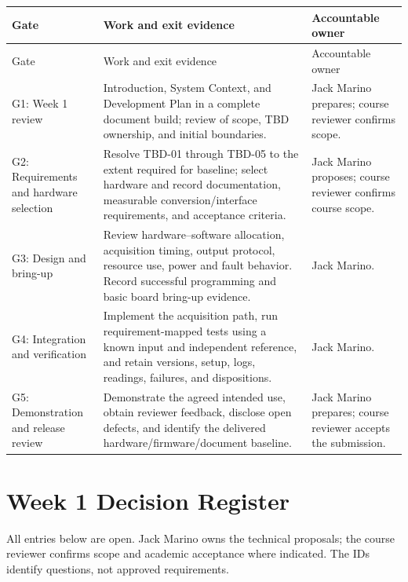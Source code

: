 \small
\begin{tabularx}{\linewidth}{L{2.4cm}Y L{3.1cm}}
\caption{Proposed Development Milestones\label{Table:WeekOneMilestones}}\\
\toprule
Gate & Work and exit evidence & Accountable owner\\
\midrule
\endfirsthead
\toprule
Gate & Work and exit evidence & Accountable owner\\
\midrule
\endhead
\bottomrule
\endlastfoot
G1: Week 1 review &
Introduction, System Context, and Development Plan in a complete document
build; review of scope, TBD ownership, and initial boundaries. &
Jack Marino prepares; course reviewer confirms scope.\\
G2: Requirements and hardware selection &
Resolve TBD-01 through TBD-05 to the extent required for baseline; select
hardware and record documentation, measurable conversion/interface
requirements, and acceptance criteria. &
Jack Marino proposes; course reviewer confirms course scope.\\
G3: Design and bring-up &
Review hardware--software allocation, acquisition timing, output protocol,
resource use, power and fault behavior. Record successful programming and
basic board bring-up evidence. &
Jack Marino.\\
G4: Integration and verification &
Implement the acquisition path, run requirement-mapped tests using a known
input and independent reference, and retain versions, setup, logs, readings,
failures, and dispositions. &
Jack Marino.\\
G5: Demonstration and release review &
Demonstrate the agreed intended use, obtain reviewer feedback, disclose open
defects, and identify the delivered hardware/firmware/document baseline. &
Jack Marino prepares; course reviewer accepts the submission.\\
\end{tabularx}
\normalsize

\section{Week 1 Decision Register}
\label{Section:WeekOneDecisions}
All entries below are open. Jack Marino owns the technical proposals;
the course reviewer confirms scope and academic acceptance where indicated.
The IDs identify questions, not approved requirements.

